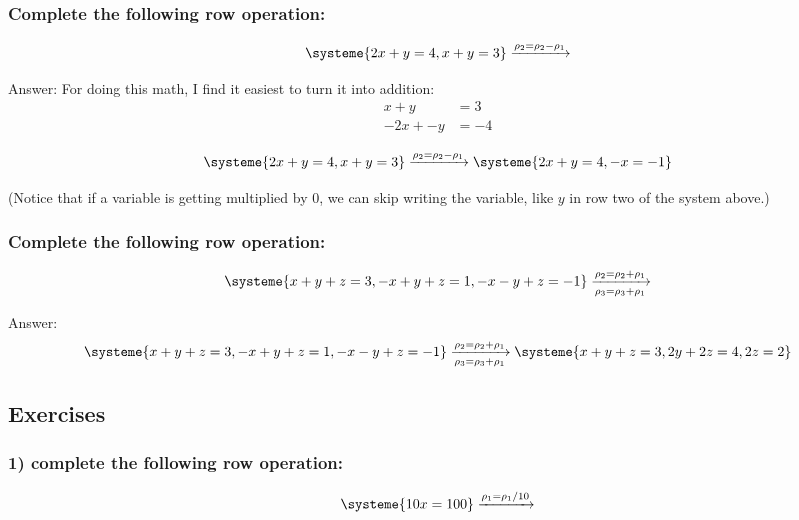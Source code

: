 \documentclass[a4paper,twoside,12pt]{memoir}  %
\begin{document}
\subsubsection{Complete the following row operation:}
\begin{equation*}
  \systeme{
     2x + y = 4,
      x + y = 3
  }
  \xrightarrow{\rho_2 = \rho_2 - \rho_1}
\end{equation*}

Answer:
For doing this math, I find it easiest to turn it into addition:
\begin{align*}
  x  +  y &=  3 \\
  -2x + -y &= -4
\end{align*}

\begin{equation*}
  \systeme{
     2x + y = 4,
      x + y = 3
  }
  \xrightarrow{\rho_2 = \rho_2 - \rho_1}
  \systeme{
     2x + y = 4,
     -x     = -1
  }
\end{equation*}

(Notice that if a variable is getting multiplied by 0, we can skip writing the variable, like $y$ in row two of the system above.)

\subsubsection{Complete the following row operation:}
\begin{equation*}
  \systeme{
    x + y + z = 3,
   -x + y + z = 1,
   -x - y + z = -1
  }
  \xrightarrow[\rho_3 = \rho_3 + \rho_1]{\rho_2 = \rho_2 + \rho_1}
\end{equation*}

Answer:
\begin{equation*}
  \systeme{
    x + y + z = 3,
   -x + y + z = 1,
   -x - y + z = -1
  }
  \xrightarrow[\rho_3 = \rho_3 + \rho_1]{\rho_2 = \rho_2 + \rho_1}
  \systeme{
    x + y + z = 3,
       2y +2z = 4,
           2z = 2
  }
\end{equation*}

\subsection{Exercises}
\subsubsection{1) complete the following row operation:}
\begin{equation*}
  \systeme{
    10x = 100
  }
  \xrightarrow{\rho_1 = \rho_1/10}
\end{equation*}
\end{document}
